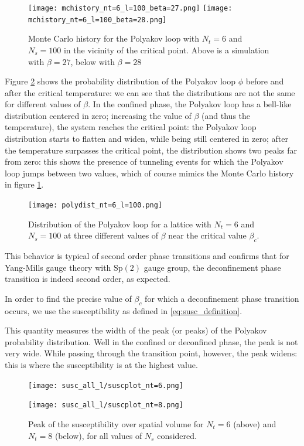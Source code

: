 \documentclass[reqno,12pt]{article}
\numberwithin{equation}{section}
\newcommand{\Sp}{\mathrm{Sp}}
\begin{document}
\begin{figure}[H]
	\centering
	\texttt{[image: mchistory\_nt=6\_l=100\_beta=27.png]}
	\texttt{[image: mchistory\_nt=6\_l=100\_beta=28.png]}
	\caption[Monte Carlo history]{Monte Carlo history for the Polyakov loop with $N_t = 6$ and $N_s = 100$ in the
	vicinity of the critical point. Above is a simulation with $\beta = 27$, below with $\beta = 28$}
	\label{fig:mchistory}
\end{figure}

Figure \ref{fig:polyloop_dist} shows the probability distribution of the Polyakov loop $\phi$ before
and after the critical temperature: we can see that the distributions are not the same for different values
of $\beta$. In the
confined phase, the Polyakov loop has a bell-like distribution centered in zero; increasing the value of
$\beta$ (and thus the temperature), the system reaches the critical point: the Polyakov loop distribution starts to
flatten and widen, while being still centered in zero; after the temperature surpasses the critical point, 
the distribution shows two peaks far from zero: this shows the presence of tunneling events for which
the Polyakov loop jumps between two values, which of course mimics the Monte Carlo history in figure \ref{fig:mchistory}.

\begin{figure}[h]
	\centering
	\texttt{[image: polydist\_nt=6\_l=100.png]}
	\caption[Polyakov loop distribution]{Distribution of the Polyakov loop for a lattice with $N_t = 6$ and
	$N_s = 100$ at three different values of $\beta$ near the critical value $\beta_c$.}
	\label{fig:polyloop_dist}
\end{figure}

This behavior is typical of second order phase transitions and confirms that for Yang-Mills gauge theory with $\Sp(2)$
gauge group, the deconfinement phase transition is indeed second order, as expected. 

In order to find the precise value of $\beta_c$ for which a deconfinement phase transition occurs, we use
the susceptibility as defined in \eqref{eq:susc_definition}.

This quantity measures the width of the peak (or peaks) of the Polyakov probability distribution. Well in the
confined or deconfined phase, the peak is not very wide. While passing through the transition point, however,
the peak widens: this is where the susceptibility is at the highest value. 

\begin{figure}[h]
	\centering
		\texttt{[image: susc\_all\_l/suscplot\_nt=6.png]} 

		\texttt{[image: susc\_all\_l/suscplot\_nt=8.png]}	
	\caption[Susceptibility peaks for $N_t = 6, 8$]{Peak of the susceptibility over spatial volume for
	$N_t = 6$ (above) and $N_t = 8$ (below), for all values of $N_s$ considered. }
	\label{fig:susc_peaks}
\end{figure}
\end{document}
